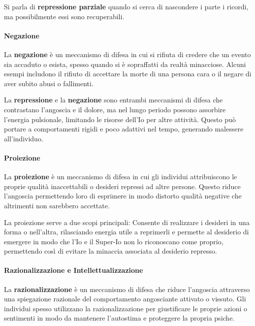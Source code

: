 \documentclass{subfiles}
\begin{document}
Si parla di \textbf{repressione parziale} quando si cerca di nascondere i parte i ricordi, ma 
possibilmente essi sono recuperabili. \\

\paragraph{Negazione}
La \textbf{negazione} è un meccanismo di difesa in cui si rifiuta di credere che un evento sia 
accaduto o esista, spesso quando si è sopraffatti da realtà minacciose. 
Alcuni esempi includono il rifiuto di accettare la morte di una persona cara o il negare di aver 
subito abusi o fallimenti. 

La \textbf{repressione} e la \textbf{negazione} sono entrambi meccanismi di difesa che 
contrastano l'angoscia e il dolore, ma nel lungo periodo possono assorbire l'energia 
pulsionale, limitando le risorse dell'Io per altre attività. Questo può portare a comportamenti 
rigidi e poco adattivi nel tempo, generando malessere all'individuo. \\

\paragraph{Proiezione}
La \textbf{proiezione} è un meccanismo di difesa in cui gli individui attribuiscono le proprie 
qualità inaccettabili o desideri repressi ad altre persone. Questo riduce l'angoscia permettendo 
loro di esprimere in modo distorto qualità negative che altrimenti non sarebbero accettate. 

La proiezione serve a due scopi principali: Consente di realizzare i desideri in una forma o 
nell'altra, rilasciando energia utile a reprimerli e permette al desiderio di emergere in modo 
che l'Io e il Super-Io non lo riconoscano come proprio, permettendo così di evitare la minaccia 
associata al desiderio represso.\\

\paragraph{Razionalizzazione e Intellettualizzazione}
La \textbf{razionalizzazione} è un meccanismo di difesa che riduce l'angoscia attraverso una 
spiegazione razionale del comportamento angosciante attivato o vissuto. 
Gli individui spesso utilizzano la razionalizzazione per giustificare le proprie azioni o 
sentimenti in modo da mantenere l'autostima e proteggere la propria psiche. 
\end{document}
